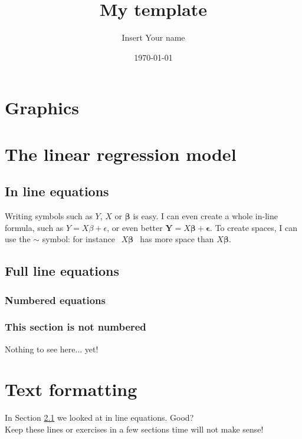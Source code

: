 \documentclass[11pt]{article}
\title{My template}
\author{Insert Your name}
\date{\today}
\begin{document}
\maketitle
\section{Graphics}
\section{The linear regression model}
\subsection{In line equations}
\label{sect.myfirst}
Writing symbols such as $Y$, $X$ or $\boldsymbol{\beta}$ is easy. I can
even create a whole in-line formula, such as $Y=X\beta+\epsilon$, or even better
$\textbf{Y}=X\boldsymbol{\beta}+\boldsymbol{\epsilon}$. To create spaces,
I can use the $\sim$ symbol: for instance $~~X\boldsymbol\beta~~$ has more
space than $X\boldsymbol\beta$.
\subsection{Full line equations}
\subsubsection{Numbered equations}
\subsubsection*{This section is not numbered}
Nothing to see here... yet!
\section{Text formatting}
In Section \ref{sect.myfirst} we looked at in line equations.
Good?\\ Keep these lines or exercises in a few
sections time will not make sense!
\end{document}
